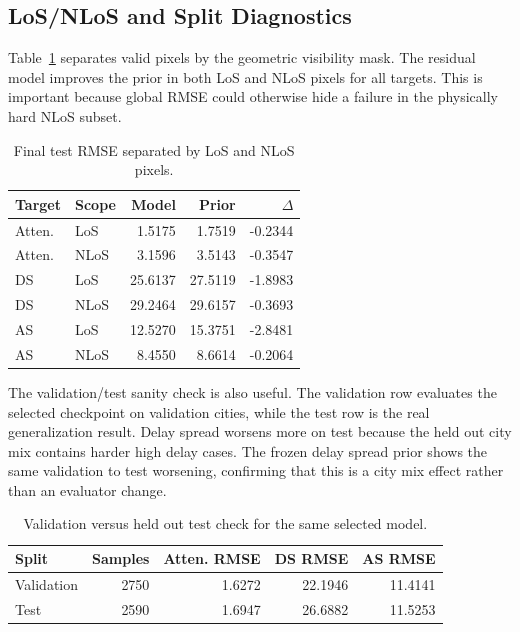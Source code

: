 \documentclass[journal]{IEEEtran}
\begin{document}
\subsection{LoS/NLoS and Split Diagnostics}

Table~\ref{tab:los-nlos} separates valid pixels by the geometric visibility
mask. The residual model improves the prior in both LoS and NLoS pixels for all
targets. This is important because global RMSE could otherwise hide a failure
in the physically hard NLoS subset.

\begin{table}[t]
\centering
\caption{Final test RMSE separated by LoS and NLoS pixels.}
\label{tab:los-nlos}
\scriptsize
\begin{tabular}{llrrr}
\toprule
Target & Scope & Model & Prior & \(\Delta\) \\
\midrule
Atten. & LoS & 1.5175 & 1.7519 & -0.2344 \\
Atten. & NLoS & 3.1596 & 3.5143 & -0.3547 \\
DS & LoS & 25.6137 & 27.5119 & -1.8983 \\
DS & NLoS & 29.2464 & 29.6157 & -0.3693 \\
AS & LoS & 12.5270 & 15.3751 & -2.8481 \\
AS & NLoS & 8.4550 & 8.6614 & -0.2064 \\
\bottomrule
\end{tabular}
\end{table}

The validation/test sanity check is also useful. The validation row evaluates
the selected checkpoint on validation cities, while the test row is the real
generalization result. Delay spread worsens more on test because the
held out city mix contains harder high delay cases. The frozen delay spread
prior shows the same validation to test worsening, confirming that this is a
city mix effect rather than an evaluator change.

\begin{table}[t]
\centering
\caption{Validation versus held out test check for the same selected model.}
\label{tab:val-test}
\scriptsize
\begin{tabular}{lrrrr}
\toprule
Split & Samples & Atten. RMSE & DS RMSE & AS RMSE \\
\midrule
Validation & 2750 & 1.6272 & 22.1946 & 11.4141 \\
Test & 2590 & 1.6947 & 26.6882 & 11.5253 \\
\bottomrule
\end{tabular}
\end{table}
\end{document}
